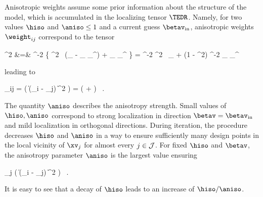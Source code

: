 Anisotropic weights assume some prior information about the structure of the model, which is accumulated 
in the localizing tensor \( \TEDR \).
Namely, for two values \( \hiso \) and \( \aniso \leq 1 \) 
and a current guess \( \betav_{\init} \), anisotropic weights \( \weight_{ij} \)
correspond to the tensor 
\begin{EQA}[rcl]
	\TEDR^{2}
	&=&
	\hiso^{-2} \bigl\{ \aniso^{2} \, (\Id_{\dimd} - \betav_{\init} \betav_{\init}^{\T}) 
	+ \betav_{\init} \betav_{\init}^{\T} \bigr\}
	=
	\hiso^{-2} \aniso^{2} \, \Id_{\dimd} 
	+ (1 - \aniso^{2}) \hiso^{-2} \betav_{\init} \betav_{\init}^{\T} 
	\, 
\label{iufhvu8kjbmnll475edf}
\end{EQA}
leading to 
\begin{EQA}[c]
	\weight_{ij}
	=
	\Kern\bigl( \| \TEDR (\Xv_{i} - \xv_{j}) \|^{2} \bigr)
	=
	\Kern\Bigl( 
		+  
	\Bigr)
	\, .
\end{EQA}
The quantity \( \aniso \) describes the anisotropy strength.
Small values of \( \hiso, \aniso \) correspond to strong localization in direction \( \betav = \betav_{\init} \)
and mild localization in orthogonal directions. 
During iteration, the procedure decreases \( \hiso \) and \( \aniso \) in a way 
to ensure sufficiently many design points in the local vicinity of \( \xv_{j} \) 
for almost every \( j \in \mathcal{J} \).
For fixed \( \hiso \) and \( \betav \), the anisotropy parameter \( \aniso \) is the largest value ensuring
\begin{EQA}[c]
	 \sum_{j \in \JJJ} 
	\sumI \Kern\bigl( \| \TEDR (\Xv_{i} - \xv_{j}) \|^{2} \bigr)
	\geq 
	\nmin
	\, .
	\qquad
\label{jhgiverkytde4w34etycja}
\end{EQA}
It is easy to see that a decay of \( \hiso \) leads to an increase of \( \hiso/\aniso \).

